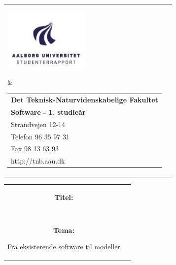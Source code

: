 \begin{titlepage}
    \setlength{\textwidth}{15cm}
	\noindent
	\begin{nopagebreak}
	{\samepage 
			\begin{tabular}{lr}
				\parbox{0.5\textwidth}{\raisebox{11mm}
					{\includegraphics[height=3.0cm]{Figurer/Billeder/aauLogo.jpg}}
				} &
				\parbox{0.5\textwidth}{
					\small
					\begin{tabular}{l}
						{\sf\small \textbf{Det Teknisk-Naturvidenskabelige Fakultet }}\\
						{\sf\small  \textbf{Software - 1. studieår}} \\
						{\sf\small Strandvejen 12-14} \\
						{\sf\small Telefon 96 35 97 31} \\
						{\sf\small Fax 98 13 63 93} \\
						{\sf\small http://tnb.aau.dk}
					\end{tabular}
				}
			\end{tabular}
			
			\noindent
			\begin{tabular}{cc}
				\parbox{7cm}{
					\begin{description}
			
						\item {\bf Titel:} 
			
							\textbf{\rapportnavn}\\
							
			  
						\item {\bf Tema:}

							Fra eksisterende software til modeller
			

\end{description}}
\end{tabular}}
\end{nopagebreak}
\end{titlepage}
